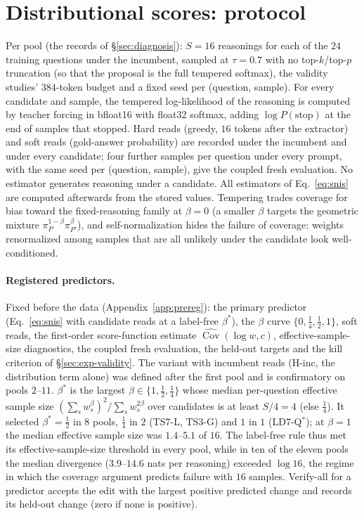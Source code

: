 \section{Distributional scores: protocol}
\label{app:dist}
Per pool (the records of \S\ref{sec:diagnosis}): $S=16$ reasonings for each of the $24$ training
questions under the incumbent, sampled at $\tau=0.7$ with no top-$k$/top-$p$ truncation (so that
the proposal is the full tempered softmax), the validity studies' $384$-token budget and a fixed
seed per (question, sample). For every candidate and sample, the tempered log-likelihood of the
reasoning is computed by teacher forcing in bfloat16 with float32 softmax, adding
$\log P(\text{stop})$ at the end of samples that stopped. Hard reads (greedy, $16$ tokens after the
extractor) and soft reads (gold-answer probability) are recorded under the incumbent and under
every candidate; four further samples per question under every prompt, with the same seed per
(question, sample), give the coupled fresh evaluation. No estimator generates reasoning under a
candidate. All estimators of Eq.~\ref{eq:snis} are computed afterwards from the stored values.
Tempering trades coverage for bias toward the fixed-reasoning family at $\beta=0$ (a smaller $\beta$
targets the geometric mixture $\pi_P^{1-\beta}\pi_{P'}^{\beta}$), and self-normalization hides the
failure of coverage: weights renormalized among samples that are all unlikely under the candidate
look well-conditioned.

\paragraph{Registered predictors.} Fixed before the data (Appendix~\ref{app:prereg}): the primary
predictor (Eq.~\ref{eq:snis} with candidate reads at a label-free $\beta^\ast$), the $\beta$ curve
$\{0,\tfrac14,\tfrac12,1\}$, soft reads, the first-order score-function estimate
$\widehat{\operatorname{Cov}}(\log w,c)$, effective-sample-size diagnostics, the coupled fresh
evaluation, the held-out targets and the kill criterion of \S\ref{sec:exp-validity}. The variant
with incumbent reads (H-inc, the distribution term alone) was defined after the first pool and is
confirmatory on pools $2$--$11$. $\beta^\ast$ is the largest $\beta\in\{1,\tfrac12,\tfrac14\}$
whose median per-question effective sample size $(\sum_s w_s^\beta)^2/\sum_s w_s^{2\beta}$ over
candidates is at least $S/4=4$ (else $\tfrac14$). It selected $\beta^\ast=\tfrac12$ in $8$ pools,
$\tfrac14$ in $2$ (TS7-L, TS3-G) and $1$ in $1$ (LD7-Q$^\ast$); at $\beta=1$ the median effective
sample size was $1.4$--$5.1$ of $16$. The label-free rule thus met its effective-sample-size
threshold in every pool, while in ten of the eleven pools the median divergence ($3.9$--$14.6$ nats
per reasoning) exceeded $\log 16$, the regime in which the coverage argument predicts failure with
$16$ samples. Verify-all for a predictor accepts the edit with the
largest positive predicted change and records its held-out change (zero if none is positive).

